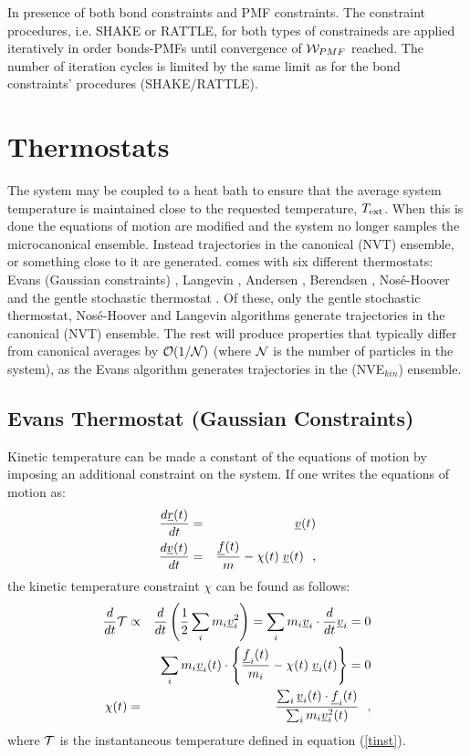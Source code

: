 In presence of both bond constraints and
PMF constraints.  The constraint procedures,
i.e. SHAKE or RATTLE, for both types of constraineds are applied
iteratively in order bonds-PMFs until convergence of ${\cal W}_{PMF}$
reached.  The number of iteration cycles is limited by the same limit
as for the bond constraints' procedures (SHAKE/RATTLE).

\section{Thermostats}

The system may be coupled to a heat bath to ensure that the average
system temperature is maintained close to the requested temperature,
$T_{\rm ext}$.  When this is done the equations of motion are
modified and the system no longer samples the microcanonical
ensemble.  Instead trajectories in the canonical
(NVT) ensemble, or something close to it
are generated.  \D comes with six different thermostats: Evans
(Gaussian constraints) \cite{evans-84a},
Langevin \cite{adelman-76a,izaguirre-01a}, Andersen \cite{andersen-79a},
Berendsen \cite{berendsen-84a}, Nos\'e-Hoover \cite{hoover-85a} and
the gentle stochastic thermostat \cite{leimkuhler-09a,samoletov-07a}.  Of
these, only the gentle stochastic thermostat, Nos\'e-Hoover and
Langevin algorithms generate trajectories in the canonical (NVT)
ensemble.  The rest will produce properties that typically differ
from canonical averages by ${\cal O}(1/{\cal N})$ \cite{allen-89a}
(where $\cal N$ is the number of particles in the system), as the
Evans algorithm generates trajectories in the (NVE$_{kin}$) ensemble.

\subsection{Evans Thermostat (Gaussian Constraints)}

Kinetic temperature can be made a constant of the equations of
motion by imposing an additional constraint on the system.  If one
writes the equations of motion as:
\begin{eqnarray}
{d \mbox{$\underline{r}$}(t) \over d t} &=& \mbox{$\underline{v}$}(t) \nonumber \\
{d \mbox{$\underline{v}$}(t) \over d t} &=& {\mbox{$\underline{f}$}(t) \over m} - \chi (t) \;
\mbox{$\underline{v}$}(t)~~,
\end{eqnarray}
the kinetic temperature constraint $\chi$ can be found as follows:
\begin{eqnarray}
\frac{d}{dt} {\cal T} &\propto& \frac{d}{dt} \left(\frac{1}{2}\sum_{i} m_{i} \mbox{$\underline{v}$}_{i}^{2} \right) =
\sum_{i} m_{i} \mbox{$\underline{v}$}_{i} \cdot \frac{d}{dt} \mbox{$\underline{v}$}_{i} = 0 \nonumber \\
& & \sum_{i} m_{i} \mbox{$\underline{v}$}_{i}(t) \cdot
\left\{ \frac{\mbox{$\underline{f}$}_{i}(t)}{m_{i}} - \chi (t) \; \mbox{$\underline{v}$}_{i}(t) \right\} = 0 \label{Evans} \\
\chi (t) &=& \frac {\sum_{i} \mbox{$\underline{v}$}_{i}(t) \cdot \mbox{$\underline{f}$}_{i}(t)} {\sum_{i} m_{i} \mbox{$\underline{v}$}_{i}^{2}(t)}~~, \nonumber
\end{eqnarray}
where $\cal T$ is the instantaneous temperature defined in equation (\ref {tinst}).

